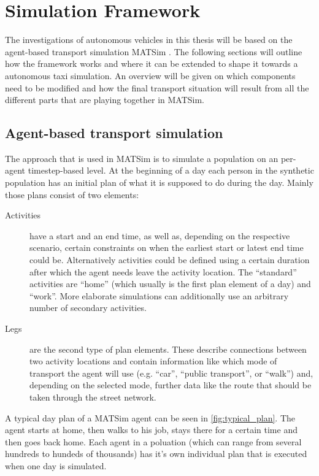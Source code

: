 \section{Simulation Framework}

The investigations of autonomous vehicles in this thesis will be based on the
agent-based transport simulation MATSim \citep{Horni2015}. The following sections
will outline how the framework works and where it can be extended to shape it
towards a autonomous taxi simulation. An overview will be given on which components
need to be modified and how the final transport situation will result from all
the different parts that are playing together in MATSim.

\subsection{Agent-based transport simulation}

The approach that is used in MATSim is to simulate a population on an per-agent
timestep-based level. At the beginning of a day each person in the synthetic
population has an initial plan of what it is supposed to do during the day. Mainly
those plans consist of two elements:

\begin{description}

\item[Activities] have a start and an end time, as well as, depending on the
respective scenario, certain constraints on when the earliest start or latest
end time could be. Alternatively activities could be defined using a certain
duration after which the agent needs leave the activity location. The ``standard'' activities are
``home'' (which usually is the first plan element of a day) and ``work''. More
elaborate simulations can additionally use an arbitrary number of secondary
activities.

\item[Legs] are the second type of plan elements. These describe connections
between two activity locations and contain information like which mode of transport
the agent will use (e.g. ``car'', ``public transport'', or ``walk'') and, depending
on the selected mode, further data like the route that should be taken through
the street network.

\end{description}

A typical day plan of a MATSim agent can be seen in \cref{fig:typical_plan}. The
agent starts at home, then walks to his job, stays there for a certain time and then
goes back home. Each agent in a poluation (which can range from several hundreds to
hundeds of thousands) has it's own individual plan that is executed when one day
is simulated.

